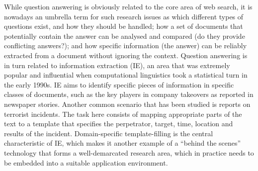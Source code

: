 \begin{multicols}{2}
While question answering is obviously related to the core area of web search, it is nowadays an umbrella term for such research issues as which different types of questions exist, and how they should be handled; how a set of documents that potentially contain the answer can be analysed and compared (do they provide conflicting answers?); and how specific information (the answer) can be reliably extracted from a document without ignoring the context. Question answering is in turn related to information extraction (IE), an area that was extremely popular and influential when computational linguistics took a statistical turn in the early 1990s. IE aims to identify specific pieces of information in specific classes of documents, such as the key players in company takeovers as reported in newspaper stories. Another common scenario that has been studied is reports on terrorist incidents. The task here consists of mapping appropriate parts of the text to a template that specifies the perpetrator, target, time, location and results of the incident. Domain-specific template-filling is the central characteristic of IE, which makes it another example of a “behind the scenes” technology that forms a well-demarcated research area, which in practice needs to be embedded into a suitable application environment.



\end{multicols}
